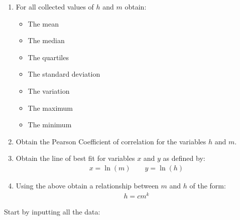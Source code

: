 \begin{enumerate}

\item 

For all collected values of \(h\) and \(m\) obtain:
\begin{itemize}
\item 

The mean

\item 

The median

\item 

The quartiles

\item 

The standard deviation

\item 

The variation

\item 

The maximum

\item 

The minimum

\end{itemize}

\item 

Obtain the Pearson Coefficient of correlation for the variables \(h\) and \(m\).

\item 

Obtain the line of best fit for variables \(x\) and \(y\) as
defined by:
\begin{equation*}
\begin{split}x=\ln(m)\qquad y=\ln(h)\end{split}
\end{equation*}
\item 

Using the above obtain a relationship between \(m\) and \(h\) of the form:
\begin{equation*}
\begin{split}h=cm^k\end{split}
\end{equation*}
\end{enumerate}



Start by inputting all the data:





